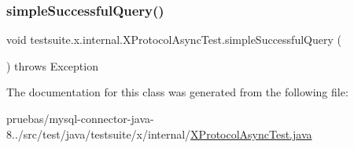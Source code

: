 \subsubsection{\texorpdfstring{simple\+Successful\+Query()}{simpleSuccessfulQuery()}}
{\footnotesize\ttfamily void testsuite.\+x.\+internal.\+X\+Protocol\+Async\+Test.\+simple\+Successful\+Query (\begin{DoxyParamCaption}{ }\end{DoxyParamCaption}) throws Exception}



The documentation for this class was generated from the following file\+:\begin{DoxyCompactItemize}
\item 
pruebas/mysql-\/connector-\/java-\/8../src/test/java/testsuite/x/internal/\mbox{\hyperlink{_x_protocol_async_test_8java}{X\+Protocol\+Async\+Test.\+java}}\end{DoxyCompactItemize}
